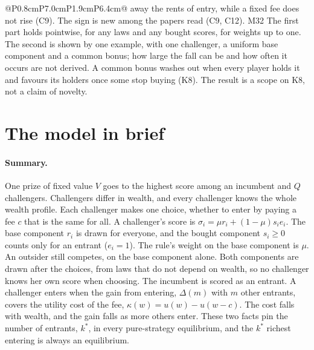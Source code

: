 \begin{longtable}{@{}P{0.8cm}P{7.0cm}P{1.9cm}P{6.4cm}@{}}
{  away the rents of entry, while a fixed fee does not rise (C9). The sign is
  new among the papers read (C9, C12).}
  {M32}
  {The first part holds pointwise, for any laws and any bought scores, for
  weights up to one. The second is shown by one example, with one challenger,
  a uniform base component and a common bonus; how large the fall can be and
  how often it occurs are not derived. A common bonus washes out when every
  player holds it and favours its holders once some stop buying (K8). The
  result is a scope on K8, not a claim of novelty.}
\end{longtable}
\normalsize

\section{The model in brief}
\label{sec:brief}

\paragraph{Summary.} One prize of fixed value $V$ goes to the highest score
among an incumbent and $Q$ challengers. Challengers differ in wealth, and every
challenger knows the whole wealth profile. Each challenger makes one choice,
whether to enter by paying a fee $c$ that is the same for all. A challenger's
score is $\sigma_i=\mu r_i+(1-\mu)s_ie_i$. The base component $r_i$ is drawn
for everyone, and the bought component $s_i\ge0$ counts only for an entrant
($e_i=1$). The rule's weight on the base component is $\mu$. An outsider still
competes, on the base component alone. Both components are drawn after the
choices, from laws that do not depend on wealth, so no challenger knows her own
score when choosing. The incumbent is scored as an entrant. A challenger enters
when the gain from entering, $\Delta(m)$ with $m$ other entrants, covers the
utility cost of the fee, $\kappa(w)=u(w)-u(w-c)$. The cost falls with wealth,
and the gain falls as more others enter. These two facts pin the number of
entrants, $k^*$, in every pure-strategy equilibrium, and the $k^*$ richest
entering is always an equilibrium.


